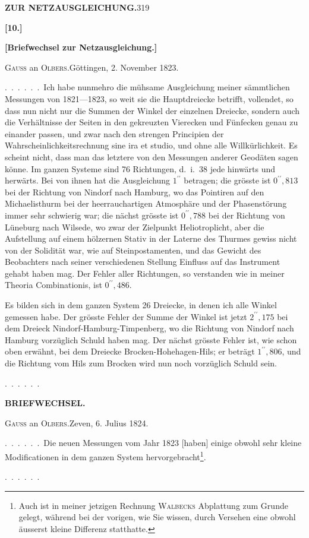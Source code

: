 \noindent\textbf{ZUR NETZAUSGLEICHUNG.}\hfill319
\begin{center}\textbf{[10.]}\par\medskip
\textbf{[Briefwechsel zur Netzausgleichung.]}\end{center}

\begin{center}\textsc{Gauss} an \textsc{Olbers}.\quad Göttingen, 2. November 1823.\end{center}

.\ .\ .\ .\ .\ .\ Ich habe nunmehro die mühsame Ausgleichung meiner sämmtlichen
Messungen von 1821---1823, so weit sie die Hauptdreiecke betrifft,
vollendet, so dass nun nicht nur die Summen der Winkel der einzelnen Dreiecke,
sondern auch die Verhältnisse der Seiten in den gekreuzten Vierecken
und Fünfecken genau zu einander passen, und zwar nach den strengen Principien
der Wahrscheinlichkeitsrechnung sine ira et studio, und ohne alle
Willkürlichkeit. Es scheint nicht, dass man das letztere von den Messungen
anderer Geodäten sagen könne. Im ganzen Systeme sind 76 Richtungen, d.\ i.\
38 jede hinwärts und herwärts. Bei  von ihnen hat die Ausgleichung
$1^{\prime\prime}$ betragen; die grösste ist $0^{\prime\prime}{,}813$ bei der Richtung von Nindorf nach Hamburg,
wo das Pointiren auf den Michaelisthurm bei der heerrauchartigen Atmosphäre
und der Phasenstörung immer sehr schwierig war; die nächst grösste
ist $0^{\prime\prime}{,}788$ bei der Richtung von Lüneburg nach Wilsede, wo zwar der Zielpunkt
Heliotroplicht, aber die Aufstellung auf einem hölzernen Stativ in der
Laterne des Thurmes gewiss nicht von der Solidität war, wie auf Steinpostamenten,
und das Gewicht des Beobachters nach seiner verschiedenen
Stellung Einfluss auf das Instrument gehabt haben mag. Der 
Fehler aller Richtungen, so verstanden wie in meiner Theoria Combinationis,
ist $0^{\prime\prime}{,}486$.

Es bilden sich in dem ganzen System 26 Dreiecke, in denen ich alle
Winkel gemessen habe. Der grösste Fehler der Summe der Winkel ist jetzt
$2^{\prime\prime}{,}175$ bei dem Dreieck Nindorf-Hamburg-Timpenberg, wo die Richtung von
Nindorf nach Hamburg vorzüglich Schuld haben mag. Der nächst grösste Fehler
ist, wie schon oben erwähnt, bei dem Dreiecke Brocken-Hohehagen-Hils; er
beträgt $1^{\prime\prime}{,}806$, und die Richtung vom Hils zum Brocken wird nun noch vorzüglich
Schuld sein.
\par\medskip
.\ .\ .\ .\ .\ .

\clearpage
{}\hfill\textbf{BRIEFWECHSEL.}
\begin{center}\textsc{Gauss} an \textsc{Olbers}.\quad Zeven, 6. Julius 1824.\end{center}

\begingroup
\makeatletter
\renewcommand{\@makefnmark}{\hbox{\normalfont\textsuperscript{*})}}
\makeatother
.\ .\ .\ .\ .\ .\ Die neuen Messungen vom Jahr 1823 [haben] einige obwohl
sehr kleine Modificationen in dem ganzen System hervorgebracht\footnote{Auch ist in meiner jetzigen Rechnung \textsc{Walbecks} Abplattung  zum Grunde gelegt, während bei der vorigen, wie Sie wissen, durch Versehen eine obwohl äusserst kleine Differenz statthatte.}.
\par\medskip
.\ .\ .\ .\ .\ .
\endgroup
